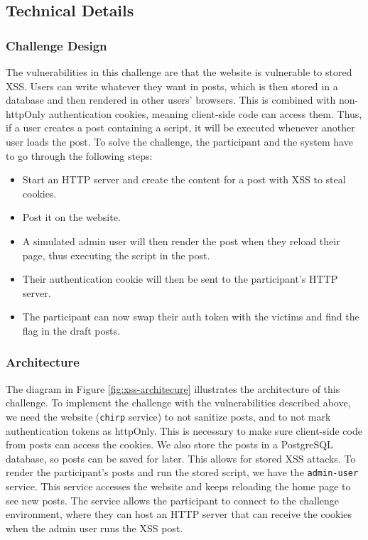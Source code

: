 
\subsection{Technical Details}

\subsubsection{Challenge Design}

The vulnerabilities in this challenge are that the website is vulnerable to stored XSS. Users can write whatever they want in posts, which is then stored in a database and then rendered in other users' browsers. This is combined with non-httpOnly authentication cookies, meaning client-side code can access them. Thus, if a user creates a post containing a script, it will be executed whenever another user loads the post. To solve the challenge, the participant and the system have to go through the following steps:

\begin{itemize}
    \item Start an HTTP server and create the content for a post with XSS to steal cookies.
    \item Post it on the website.
    \item A simulated admin user will then render the post when they reload their page, thus executing the script in the post.
    \item Their authentication cookie will then be sent to the participant's HTTP server.
    \item The participant can now swap their auth token with the victims and find the flag in the draft posts.
\end{itemize}

\subsubsection{Architecture}

The diagram in Figure \ref{fig:xss-architecure} illustrates the architecture of this challenge. To implement the challenge with the vulnerabilities described above, we need the website (\texttt{chirp} service) to not sanitize posts, and to not mark authentication tokens as httpOnly. This is necessary to make sure client-side code from posts can access the cookies. We also store the posts in a PostgreSQL database, so posts can be saved for later. This allows for stored XSS attacks. To render the participant's posts and run the stored script, we have the \texttt{admin-user} service. This service accesses the website and keeps reloading the home page to see new posts. The  service allows the participant to connect to the challenge environment, where they can host an HTTP server that can receive the cookies when the admin user runs the XSS post.

